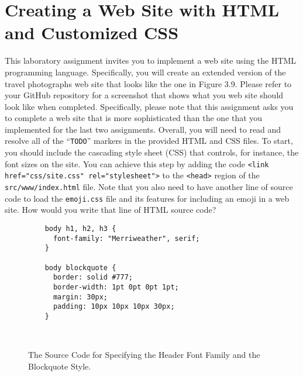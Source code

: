 \documentclass[11pt]{article}
\newcommand{\mainprogramsource}{\lstinline{src/www/index.html}}
\newcommand{\command}[1]{``\lstinline{#1}''}
\newcommand{\program}[1]{\lstinline{#1}}
\begin{document}
\section*{Creating a Web Site with HTML and Customized CSS}

This laboratory assignment invites you to implement a web site using the HTML
programming language. Specifically, you will create an extended version of the
travel photographs web site that looks like the one in Figure 3.9. Please refer
to your GitHub repository for a screenshot that shows what you web site should
look like when completed. Specifically, please note that this assignment asks
you to complete a web site that is more sophisticated than the one that you
implemented for the last two assignments. Overall, you will need to read and
resolve all of the \command{TODO} markers in the provided HTML and CSS files. To
start, you should include the cascading style sheet (CSS) that controls, for
instance, the font sizes on the site. You can achieve this step by adding the
code \program{<link href="css/site.css" rel="stylesheet">} to the
\program{<head>} region of the \mainprogramsource{} file. Note that you also
need to have another line of source code to load the \program{emoji.css} file
and its features for including an emoji in a web site. How would you write that
line of HTML source code?

\begin{figure}[t]
  \centering
  \begin{verbatim}
    body h1, h2, h3 {
      font-family: "Merriweather", serif;
    }

    body blockquote {
      border: solid #777;
      border-width: 1pt 0pt 0pt 1pt;
      margin: 30px;
      padding: 10px 10px 10px 30px;
    }
  \end{verbatim}
  \vspace*{-.35in}
  \caption{The Source Code for Specifying the Header Font Family and the
  Blockquote Style.}~\label{fig:css}
  \vspace*{-.25in}
\end{figure}
\end{document}
